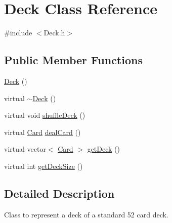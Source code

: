 \hypertarget{class_deck}{\section{Deck Class Reference}
\label{class_deck}
}


{\ttfamily \#include $<$Deck.\-h$>$}

\subsection*{Public Member Functions}
\begin{DoxyCompactItemize}
\item 
\hyperlink{class_deck_a57ae1cb4ac6fd61c249cefb2db85eb99}{Deck} ()
\item 
virtual \hyperlink{class_deck_a0455563eccd460a9ff84e74b858beb30}{$\sim$\-Deck} ()
\item 
virtual void \hyperlink{class_deck_a7487a75ebb6b729a97b5250b101324b4}{shuffle\-Deck} ()
\item 
virtual \hyperlink{class_card}{Card} \hyperlink{class_deck_a621e5f6f80e45ee17176686833c3299c}{deal\-Card} ()
\item 
virtual vector$<$ \hyperlink{class_card}{Card} $>$ \hyperlink{class_deck_a95171bc96437f86ce24aa0103eafcea6}{get\-Deck} ()
\item 
virtual int \hyperlink{class_deck_a43795439864d704d33feffd43d10adb7}{get\-Deck\-Size} ()
\end{DoxyCompactItemize}


\subsection{Detailed Description}
Class to represent a deck of a standard 52 card deck. 

